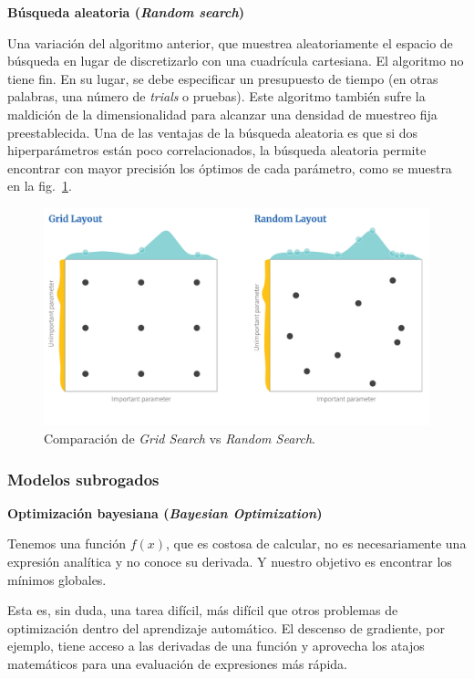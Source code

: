 \documentclass[a4paper,12pt]{article}
\begin{document}
\textbf{Búsqueda aleatoria (\textit{Random search})}

Una variación del algoritmo anterior, que muestrea aleatoriamente el espacio de búsqueda en lugar de discretizarlo con una cuadrícula cartesiana. El algoritmo no tiene fin. En su lugar, se debe especificar un presupuesto de tiempo (en otras palabras, una número de \textit{trials} o pruebas). Este algoritmo también sufre la maldición de la dimensionalidad para alcanzar una densidad de muestreo fija preestablecida. Una de las ventajas de la búsqueda aleatoria es que si dos hiperparámetros están poco correlacionados, la búsqueda aleatoria permite encontrar con mayor precisión los óptimos de cada parámetro, como se muestra en la fig.~\ref{fig:grid_vs_search}. 

\begin{figure}[H]
	\begin{center}
	\includegraphics[width=1\textwidth]{grid_vs_search_v3.png}
  	\caption{Comparación de \textit{Grid Search} vs \textit{Random Search}.}
  	\label{fig:grid_vs_search}
  	\end{center}
\end{figure}

\subsubsection{Modelos subrogados}

\textbf{Optimización bayesiana (\textit{Bayesian Optimization})} 

Tenemos una función $f(x)$, que es costosa de calcular, no es necesariamente una expresión analítica y no conoce su derivada. Y nuestro objetivo es encontrar los mínimos globales. \citep{Ye2020Oct}

Esta es, sin duda, una tarea difícil, más difícil que otros problemas de optimización dentro del aprendizaje automático. El descenso de gradiente, por ejemplo, tiene acceso a las derivadas de una función y aprovecha los atajos matemáticos para una evaluación de expresiones más rápida.
\end{document}
